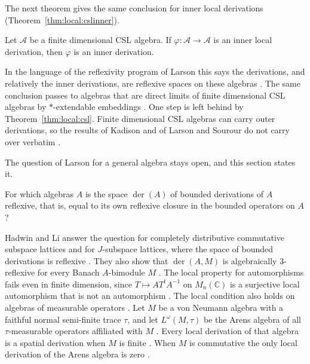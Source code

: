 The next theorem gives the same conclusion for inner local derivations (Theorem~\ref{thm:local:cslinner}).

\begin{theorem}\label{thm:local:cslinner}
Let $\mathcal{A}$ be a finite dimensional CSL algebra. If
$\varphi\colon\mathcal{A}\to\mathcal{A}$ is an inner local derivation, then
$\varphi$ is an inner derivation.
\end{theorem}

In the language of the reflexivity program of Larson this says the derivations,
and relatively the inner derivations, are reflexive spaces on these
algebras \cite[pp.~78--79]{Crist1996Local}. The same conclusion passes to
algebras that are direct limits of finite dimensional CSL algebras by
$*$-extendable embeddings \cite[p.~78]{Crist1996Local}. One step is left
behind by Theorem~\ref{thm:local:csl}. Finite dimensional CSL algebras can
carry outer derivations, so the
results of Kadison and of Larson and Sourour do not carry over verbatim
\cite[p.~79]{Crist1996Local}.

The question of Larson for a general algebra stays open, and this section
states it. %

\begin{problem}\label{prob:open:larson}
For which algebras $A$ is the space $\operatorname{der}(A)$ of bounded
derivations of $A$ reflexive, that is, equal to its own reflexive closure in the
bounded operators on $A$?
\end{problem}

Hadwin and Li answer the question for completely distributive commutative
subspace lattices and for $J$-subspace lattices, where the space of bounded
derivations is reflexive \cite[Theorem~2.15, p.~708]{HadwinLi2004}. They also
show that $\operatorname{der}(A,M)$ is algebraically $3$-reflexive for every
Banach $A$-bimodule $M$ \cite[Theorem~2.19, p.~710]{HadwinLi2004}. The local
property for automorphisms fails even in finite dimension, since
$T\mapsto AT^{t}A^{-1}$ on $M_n(\mathbb{C})$ is a surjective local automorphism
that is not an automorphism \cite[p.~713]{HadwinLi2004}.
The local condition also holds on algebras of measurable operators \cite[p.~1]{AyupovKudaybergenovNurjanovAlauatdinov2011}. Let $M$ be
a von Neumann algebra with a faithful normal semi-finite trace $\tau$, and let
$L^{\omega}(M,\tau)$ be the Arens algebra of all $\tau$-measurable operators
affiliated with $M$ \cite[p.~1]{AyupovKudaybergenovNurjanovAlauatdinov2011}.
Every local derivation of that algebra is a spatial derivation when $M$ is
finite \cite[Theorem~2.4, p.~7]{AyupovKudaybergenovNurjanovAlauatdinov2011}.
When $M$ is commutative the only local derivation of the Arens algebra is zero
\cite[Corollary~2.5, p.~7]{AyupovKudaybergenovNurjanovAlauatdinov2011}.

